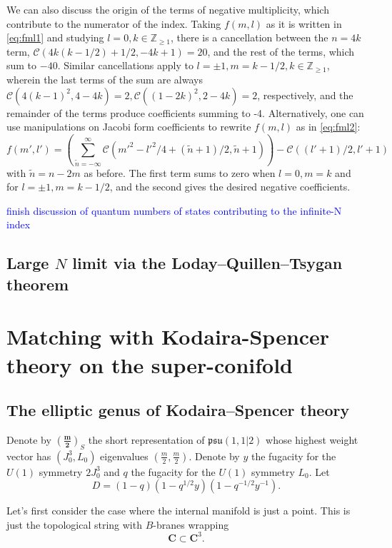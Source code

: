 \documentclass[11pt]{amsart}
\newcommand{\C}{\mathbf C}
\newcommand\beqn{\begin{equation}}
\newcommand\eeqn{\end{equation}}
\newcommand{\lie}{\mathfrak}
\theoremstyle{thm}
\numberwithin{equation}{subsection}
\theoremstyle{def}
\theoremstyle{rem}
\begin{document}
We can also discuss the origin of the terms of negative multiplicity, which contribute to the numerator of the index. Taking $f(m,l)$ as it is written in \ref{eq:fml1} and studying $l=0, k \in \mathbb{Z}_{\geq 1}$, there is a cancellation between the $n=4k$ term, $\mathcal{C}(4k(k-1/2) + 1/2,-4k+1)=20$, and the rest of the terms, which sum to $-40$. Similar cancellations apply to $l=\pm 1, m = k-1/2, k \in \mathbb{Z}_{\geq 1}$, wherein the last terms of the sum are always $\mathcal{C}(4(k-1)^2, 4-4k) = 2, \mathcal{C}((1-2k)^2, 2-4k) = 2$, respectively, and the remainder of the terms produce coefficients summing to -4. Alternatively, one can use manipulations on Jacobi form coefficients to rewrite $f(m, l)$ as in \ref{eq:fml2}:
\begin{equation}
f(m', l') =\left(\sum_{\tilde{n}= - \infty}^{\infty}\mathcal{C}(m'^2 - l'^2/4 + (\tilde{n} + 1)/2, \tilde{n} + 1) \right) - \mathcal{C}((l' + 1)/2, l' + 1)
\end{equation} with $\tilde{n} = n-2m$ as before. The first term sums to zero when $l=0, m= k$ and for $l=\pm 1, m = k-1/2$, and the second gives the desired negative coefficients.


\textcolor{blue}{finish discussion of quantum numbers of states contributing to the infinite-N index}

\subsection{Large $N$ limit via the Loday--Quillen--Tsygan theorem} 


\section{Matching with Kodaira-Spencer theory on the super-conifold}


\subsection{The elliptic genus of Kodaira--Spencer theory} 

Denote by $\left(\mathbf{\frac{m}{2}}\right)_S$ the short representation of $\lie{psu}(1,1|2)$ whose highest weight vector has $(J_0^3,L_0)$ eigenvalues $(\frac{m}{2}, \frac{m}{2})$. 
Denote by $y$ the fugacity for the $U(1)$ symmetry $2J_0^3$ and $q$ the fugacity for the $U(1)$ symmetry $L_0$.
Let 
\beqn
D = (1-q)(1-q^{1/2} y)(1-q^{-1/2}y^{-1}) .
\eeqn

Let's first consider the case where the internal manifold is just a point.
This is just the topological string with $B$-branes wrapping 
\beqn
\C \subset \C^3 .
\eeqn 
\end{document}
